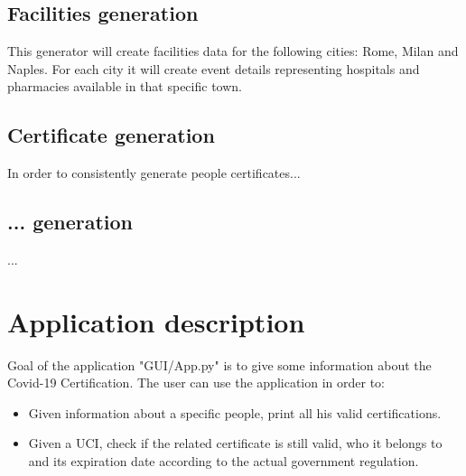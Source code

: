 \documentclass{article}
\begin{document}
\subsection{Facilities generation}
This generator will create facilities data for the following cities: Rome, Milan and Naples. For each city it will create event details representing hospitals and pharmacies available in that specific town. 

\subsection{Certificate generation}
In order to consistently generate people certificates...

\subsection{... generation}
...


\newpage
\section{Application description}
Goal of the application {\selectfont"GUI/App.py"} is to give some information about the Covid-19 Certification.
The user can use the application in order to:
\begin{itemize}
    \item Given information about a specific people, print all his valid certifications.
    \item Given a UCI, check if the related certificate is still valid, who it belongs to and its expiration date according to the actual government regulation.
\end{itemize}

\end{document}
